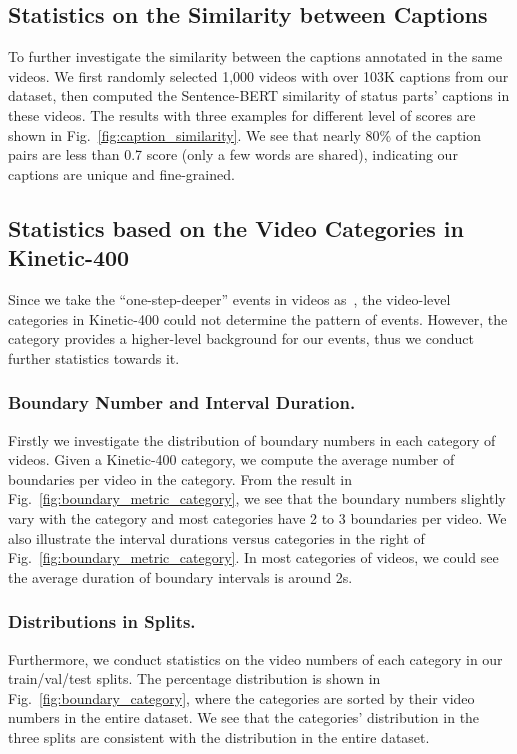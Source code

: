 \documentclass[runningheads]{llncs}
\begin{document}
\subsection{Statistics on the Similarity between Captions}

To further investigate the similarity between the captions annotated in the same videos. We first randomly selected 1,000 videos with over 103K captions from our dataset, then computed the Sentence-BERT similarity of status parts’ captions in these videos. The results with three examples for different level of scores are shown in Fig.~\ref{fig:caption_similarity}. We see that nearly 80\% of the caption pairs are less than 0.7 score (only a few words are shared), indicating our captions are unique and fine-grained.


\subsection{Statistics based on the Video Categories in Kinetic-400}

Since we take the “one-step-deeper” events in videos as~\cite{shou2021generic}, the video-level categories in Kinetic-400 could not determine the pattern of events. However, the category provides a higher-level background for our events, thus we conduct further statistics towards it.

\subsubsection{Boundary Number and Interval Duration.}
Firstly we investigate the distribution of boundary numbers in each category of videos. Given a Kinetic-400 category, we compute the average number of boundaries per video in the category. From the result in Fig.~\ref{fig:boundary_metric_category}, we see that the boundary numbers slightly vary with the category and most categories have 2 to 3 boundaries per video. We also illustrate the interval durations versus categories in the right of Fig.~\ref{fig:boundary_metric_category}. In most categories of videos, we could see the average duration of boundary intervals is around 2s.

\subsubsection{Distributions in Splits.}
Furthermore, we conduct statistics on the video numbers of each category in our train/val/test splits. The percentage distribution is shown in Fig.~\ref{fig:boundary_category}, where the categories are sorted by their video numbers in the entire dataset. We see that the categories’ distribution in the three splits are consistent with the distribution in the entire dataset.
\end{document}
